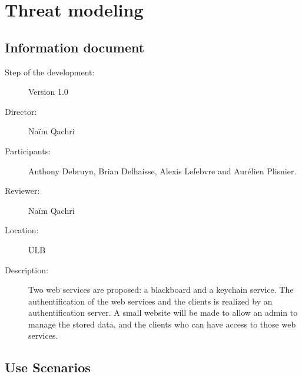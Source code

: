 
 


\titleTH %
\thispagestyle{empty}
\clearpage

\section{Threat modeling}
\setcounter{page}{1}

\subsection{Information document}
\begin{mdframed}
	\begin{description}
		\item[Step of the development:] Version 1.0
		\item[Director:] Naïm Qachri
		\item[Participants:] Anthony Debruyn, Brian Delhaisse, Alexis Lefebvre and Aurélien Plisnier.
		\item[Reviewer:] Naïm Qachri
		\item[Location:] ULB
		\item[Description:] Two web services are proposed: a blackboard and a keychain service. The authentification of the web services and the clients is realized by an authentification server. A small website will be made to allow an admin to manage the stored data, and the clients who can have access to those web services.
	\end{description}
\end{mdframed}


\subsection{Use Scenarios}


